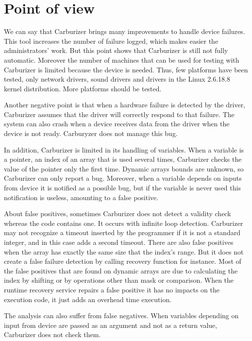 \documentclass[11pt]{article}
\begin{document}
\section{Point of view}
We can say that Carburizer brings many improvements to handle device failures. This tool increases the number of failure logged, which makes easier the administrators' work. But this point shows that Carburizer is still not fully automatic. Moreover the number of machines that can be used for testing with Carburizer is limited because the device is needed. Thus, few platforms have been tested, only network drivers, sound drivers and drivers in the Linux 2.6.18.8 kernel distribution. More platforms should be tested.

Another negative point is that when a hardware failure is detected by the driver, Carburizer assumes that the driver will correctly respond to that failure. The system can also crash when a device receives data from the driver when the device is not ready. Carburyzer does not manage this bug.

In addition, Carburizer is limited in its handling of variables. When a variable is a pointer, an index of an array that is used several times, Carburizer checks the value of the pointer only the first time. Dynamic arrays bounds are unknown, so Carburizer can only report a bug. Moreover, when a variable depends on inputs from device it is notified as a possible bug, but if the variable is never used this notification is useless, amounting to a false positive.

About false positives, sometimes Carburizer does not detect a validity check whereas the code contains one. It occurs with infinite loop detection. Carburizer may not recognize a timeout inserted by the programmer if it is not a standard integer, and in this case adds a second timeout. There are also false positives when the array has exactly the same size that the index's range. But it does not create a false failure detection by calling recovery function for instance. Most of the false positives that are found on dynamic arrays are due to calculating the index by shifting or by operations other than mask or comparison. When the runtime recovery service repairs a false positive it has no impacts on the execution code, it just adds an overhead time execution.

The analysis can also suffer from false negatives. When variables depending on input from device are passed as an argument and not as a return value, Carburizer does not check them. 
\end{document}
